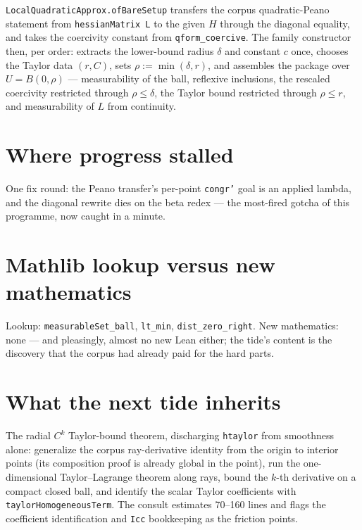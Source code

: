 \documentclass[11pt]{article}
\newcommand{\code}[1]{\texttt{#1}}
\begin{document}
\begin{sloppypar}
\code{LocalQuadraticApprox.ofBareSetup} transfers the corpus
quadratic-Peano statement from \code{hessianMatrix L} to the given
$H$ through the diagonal equality, and takes the coercivity constant
from \code{qform\_coercive}. The family constructor then, per order:
extracts the lower-bound radius $\delta$ and constant $c$ once,
chooses the Taylor data $(r, C)$, sets $\rho := \min(\delta, r)$,
and assembles the package over $U = B(0,\rho)$ --- measurability of
the ball, reflexive inclusions, the rescaled coercivity restricted
through $\rho \le \delta$, the Taylor bound restricted through
$\rho \le r$, and measurability of $L$ from continuity.
\end{sloppypar}

\section{Where progress stalled}

One fix round: the Peano transfer's per-point \code{congr'} goal is
an applied lambda, and the diagonal rewrite dies on the beta redex
--- the most-fired gotcha of this programme, now caught in a minute.

\section{Mathlib lookup versus new mathematics}

Lookup: \code{measurableSet\_ball}, \code{lt\_min},
\code{dist\_zero\_right}. New mathematics: none --- and pleasingly,
almost no new Lean either; the tide's content is the discovery that
the corpus had already paid for the hard parts.

\section{What the next tide inherits}

The radial $C^k$ Taylor-bound theorem, discharging \code{htaylor}
from smoothness alone: generalize the corpus ray-derivative identity
from the origin to interior points (its composition proof is already
global in the point), run the one-dimensional Taylor--Lagrange
theorem along rays, bound the $k$-th derivative on a compact closed
ball, and identify the scalar Taylor coefficients with
\code{taylorHomogeneousTerm}. The consult estimates 70--160 lines
and flags the coefficient identification and \code{Icc} bookkeeping
as the friction points.
\end{document}
